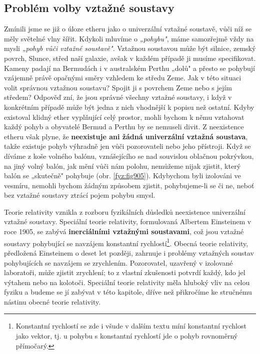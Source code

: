     \subsection{Problém volby vztažné soustavy}
      Zmínili jsme se již o úloze etheru jako o univerzální vztažné soustavě, vůči níž se měly
      světelné vlny šířit. Kdykoli mluvíme o \emph{„pohybu"}, máme samozřejmě vždy na mysli
      \emph{„pohyb vůči vztažné soustavě"}. Vztažnou soustavou může být silnice, zemský povrch,
      Slunce, střed naší galaxie, avšak v každém případě ji musíme specifikovat. Kameny padají na
      Bermudách i v australském Perthu „dolů" a přesto se pohybují vzájemně právě opačnými směry
      vzhledem ke středu Zeme. Jak v této situaci volit správnou vztažnou soustavu? Spojit ji s
      povrchem Zeme nebo s jejím středem? Odpověď zní, že jsou správné všechny vztažné soustavy, i
      když v konkrétním případě může být jedna z nich vhodnější k popisu než ostatní. Kdyby
      existoval klidný ether vyplňující celý prostor, mohli bychom k němu vztahovat každý pohyb a
      obyvatelé Bermud a Perthu by se nemuseli divit. Z neexistence etheru však plyne, že
      \textbf{neexistuje ani žádná univerzální vztažná soustava}, takže existuje pohyb výhradně jen
      vůči pozorovateli nebo jeho přístroji. Když se díváme z koše volného balónu, vznášejí­cího se
      nad souvislou oblačnou pokrývkou, na jiný volný balón, jak mění vůči nám polohu, nemůžeme
      nijak zjistit, který balón se „skutečně" pohybuje (obr. \ref{fyz:fig905}). Kdybychom byli
      izolováni ve vesmíru, nemohli bychom žádným způsobem zjistit, pohybujeme-li se či ne, neboť
      bez vztažné soustavy ztrácí pojem pohybu smysl.


      Teorie relativity vznikla z rozboru fyzikálních důsledků neexistence univerzální vztažné
      soustavy. Speciální teorie relativity, formulovaná Albertem Einsteinem v roce 1905, se zabývá
      \textbf{inerciálními vztažnými soustavami}, což jsou vztažné soustavy pohybující se navzájem
      konstantní rychlostí\footnote{Konstantní rychlostí se zde i všude v dalším textu míní
      konstantní rychlost jako vektor, tj. u pohybu s konstantní rychlostí jde o pohyb rovnoměrný
      přímočarý.}. Obecná teorie relativity, předložená Einsteinem o deset let později, zahrnuje i
      problémy vztažných soustav pohybujících se navzájem se zrychlením. Pozorovatel, uzavřený v
      izolované laboratoři, může zjistit zrychlení; to z vlastní zkušenosti potvrdí každý, kdo jel
      výtahem nebo na kolotoči. Speciální teorie relativity měla hluboký vliv na celou fyziku a
      budeme se jí zabývat v této kapitole, dříve než přikročíme ke stručnému nástinu obecné teorie
      relativity.

